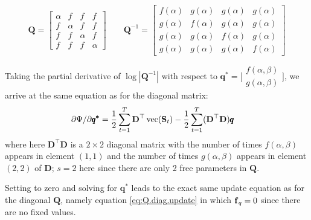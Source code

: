 \documentclass[]{article}
\def\DD{\mbox{$\mathbf D$}}	\def\dd{\mbox{$\mathbf d$}}
\def\QQ{\mbox{$\mathbf Q$}}	 \def\qq{\mbox{$\mathbf q$}} \def\Qb{\mbox{$\mathbf G$}}  \def\Qm{\mathbb{Q}}
\def\SS{\mbox{$\mathbf S$}}
\def\vec{\,\textup{\textrm{vec}}}
\begin{document}
\begin{equation*}
\QQ=
\begin{bmatrix}
\alpha&f&f&f\\
f&\alpha&f&f\\
f&f&\alpha&f\\
f&f&f&\alpha
\end{bmatrix}\quad\quad
\QQ^{-1}=
\begin{bmatrix}
f(\alpha)&g(\alpha)&g(\alpha)&g(\alpha)\\
g(\alpha)&f(\alpha)&g(\alpha)&g(\alpha)\\
g(\alpha)&g(\alpha)&f(\alpha)&g(\alpha)\\
g(\alpha)&g(\alpha)&g(\alpha)&f(\alpha)
\end{bmatrix}
\end{equation*}

Taking the partial derivative of $\log |\QQ^{-1}|$ with respect to $\pmb{q^{*}}=\big[\begin{smallmatrix}f(\alpha,\beta)\\g(\alpha,\beta)\end{smallmatrix}\big]$, we arrive at the same equation as for the diagonal matrix:
\begin{equation}\label{eq:Q.eqvarcov2}
\begin{split}
&\partial\Psi/\partial\pmb{q^{*}} = 
\frac{1}{2} \sum_{t=1}^T\DD^\top \vec(\SS_t) - \frac{1}{2}\sum_{t=1}^T(\DD^\top\DD)\pmb{q}
\end{split}
\end{equation}
where here $\DD^\top\DD$ is a $2 \times 2$ diagonal matrix with the number of times $f(\alpha,\beta)$ appears in element $(1,1)$ and the number of times $g(\alpha,\beta)$ appears in element $(2,2)$ of $\DD$; $s=2$ here since there are only 2 free parameters in $\QQ$.

Setting to zero and solving for $\pmb{q^{*}}$ leads to the exact same update equation as for the diagonal $\QQ$, namely equation \ref{eq:Q.diag.update} in which $\mbox{$\mathbf f$}_q = 0$ since there are no fixed values.
\end{document}
